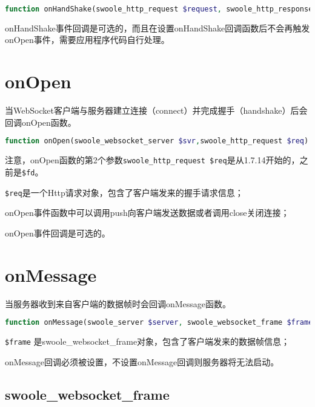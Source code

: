 \begin{lstlisting}[language=PHP]
function onHandShake(swoole_http_request $request, swoole_http_response $response)
\end{lstlisting}

onHandShake事件回调是可选的，而且在设置onHandShake回调函数后不会再触发onOpen事件，需要应用程序代码自行处理。

\section{onOpen}

当WebSocket客户端与服务器建立连接（connect）并完成握手（handshake）后会回调onOpen函数。


\begin{lstlisting}[language=PHP]
function onOpen(swoole_websocket_server $svr,swoole_http_request $req)
\end{lstlisting}

注意，onOpen函数的第2个参数\texttt{swoole\_http\_request \$req}是从1.7.14开始的，之前是\texttt{\$fd}。

\begin{compactitem}
\item \texttt{\$req}是一个Http请求对象，包含了客户端发来的握手请求信息；
\item onOpen事件函数中可以调用push向客户端发送数据或者调用close关闭连接；
\item onOpen事件回调是可选的。
\end{compactitem}

\section{onMessage}

当服务器收到来自客户端的数据帧时会回调onMessage函数。



\begin{lstlisting}[language=PHP]
function onMessage(swoole_server $server, swoole_websocket_frame $frame)
\end{lstlisting}

\begin{compactitem}
\item \texttt{\$frame} 是swoole\_websocket\_frame对象，包含了客户端发来的数据帧信息；
\item onMessage回调必须被设置，不设置onMessage回调则服务器将无法启动。
\end{compactitem}

\subsection{swoole\_websocket\_frame}

